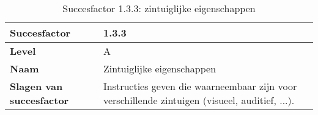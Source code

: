 \begin{table}
    \centering
    \caption{Succesfactor 1.3.3: zintuiglijke eigenschappen }
     \hspace*{-1cm}\begin{tabular}{|l|p{12cm}|} 
        \hline
        \textbf{Succesfactor}                 & 1.3.3                                                                                                                                                                                                                                                                                                                                                                                                                                                                                                             \\ 
        \hline
        \textbf{Level}                        & A                                                                                                                                                                                                                                                                                                                                                                                                                                                                                                                 \\ 
        \hline
        \textbf{Naam}                         & Zintuiglijke eigenschappen~~                                                                                                                                                                                                                                                                                                                                                                                                                                                                                      \\ 
        \hline
        \textbf{Slagen van succesfactor}      & Instructies geven die waarneembaar zijn voor verschillende zintuigen (visueel, auditief, ...).                                                                                                                                                                                                                                                                                                                                                                                                                    \\ 

\end{tabular}
\end{table}
